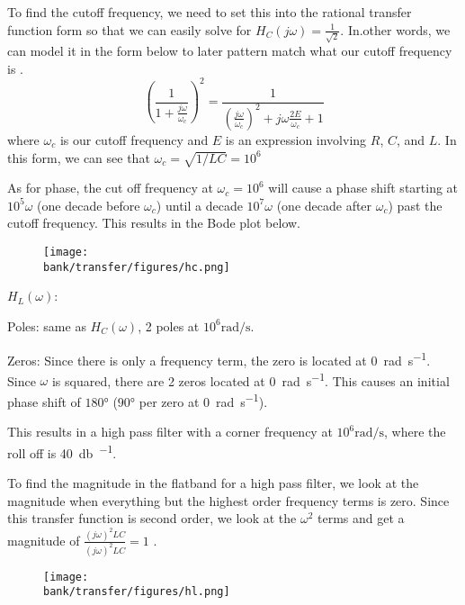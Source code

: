 \begin{enumerate}
{    %
    
    
    To find the cutoff frequency, we need to set this into the rational transfer function form so that we can easily solve for $H_C(j\omega)= \frac{1}{\sqrt{2}}$. In.other words, we can model it in the form below to later pattern match what our cutoff frequency is .
    \[(\frac{1}{1 + \frac{j\omega}{\omega_c}})^2 = \frac{1}{(\frac{j\omega}{\omega_c})^2 + j\omega \frac{2E}{\omega_c} + 1}\] 
    where $\omega_c$ is our cutoff frequency and $E$ is an expression involving $R$, $C$, and $L$. In this form, we can see that $\omega_c = \sqrt{1/LC} = 10^6$
    
    
    As for phase, the cut off frequency at $\omega_c = 10^6$ will cause a phase shift starting at $10^5 \omega$ (one decade before $\omega_c$) until a decade $10^7 \omega$ (one decade after $\omega_c$) past the cutoff frequency. This results in the Bode plot below.

      \begin{figure}[H]\centering
  \texttt{[image: \\bank/transfer/figures/hc.png]}
   \end{figure}

$H_L(\omega)$:

Poles: same as $H_C(\omega)$, 2 poles at $10^6 \si{\radian\per\second}$.

Zeros: Since there is only a frequency term, the zero is located at \SI{0}{\radian\per\second}. Since $\omega$ is squared, there are 2 zeros located at \SI{0}{\radian\per\second}. This causes an initial phase shift of $\ang{180}$ ($\ang{90}$ per zero at \SI{0}{\radian\per\second}).

This results in a high pass filter with a corner frequency at $10^6 \si{\radian\per\second}$, where the roll off is \SI{40}{\decibel\per\decade}.

To find the magnitude in the flatband for a high pass filter, we look at the magnitude when everything but the highest order frequency terms is zero. Since this transfer function is second order, we look at the $\omega^2$ terms and get a magnitude of $\frac{(j\omega)^2LC}{(j\omega)^2LC} = 1$
.
   \begin{figure}[H]\centering
   \texttt{[image: \\bank/transfer/figures/hl.png]}
   \end{figure}
  
}
\end{enumerate}
